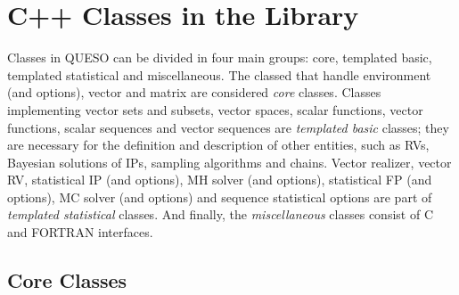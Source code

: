 \chapter{C++ Classes in the Library}\label{ch-classes}
\thispagestyle{headings}




Classes in QUESO can be divided in four main groups: core, templated basic, templated statistical and miscellaneous.
The classed that handle environment (and options), vector and matrix are considered \textit{core} classes. Classes implementing vector sets and subsets, vector spaces,  scalar functions, vector functions, scalar sequences and vector sequences are \textit{templated basic} classes; they are necessary for the definition and description of other entities, such as RVs, Bayesian solutions of IPs, sampling algorithms and chains.  Vector realizer, vector RV, statistical IP (and options), MH solver (and options), statistical FP (and options), MC solver (and options) and sequence statistical options are part of \textit{templated statistical} classes. And finally, the \textit{miscellaneous} classes consist of C and FORTRAN interfaces.





\section{Core Classes}



